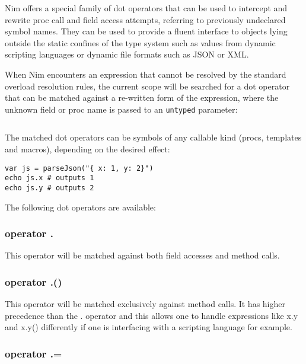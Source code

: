 Nim offers a special family of dot operators that can be used to
intercept and rewrite proc call and field access attempts, referring to
previously undeclared symbol names. They can be used to provide a fluent
interface to objects lying outside the static confines of the type
system such as values from dynamic scripting languages or dynamic file
formats such as JSON or XML.

When Nim encounters an expression that cannot be resolved by the
standard overload resolution rules, the current scope will be searched
for a dot operator that can be matched against a re-written form of the
expression, where the unknown field or proc name is passed to an
\texttt{untyped} parameter:

\begin{verbatim}
\end{verbatim}

The matched dot operators can be symbols of any callable kind (procs,
templates and macros), depending on the desired effect:

\begin{verbatim}
var js = parseJson("{ x: 1, y: 2}")
echo js.x # outputs 1
echo js.y # outputs 2
\end{verbatim}

The following dot operators are available:

\hypertarget{operator-.}{%
\subsubsection{\texorpdfstring{operator
{.}}{operator .}}\label{operator-.}}

This operator will be matched against both field accesses and method
calls.

\hypertarget{operator-.-1}{%
\subsubsection{\texorpdfstring{operator
{.()}}{operator .()}}\label{operator-.-1}}

This operator will be matched exclusively against method calls. It has
higher precedence than the {.} operator and this allows one to handle
expressions like {x.y} and {x.y()} differently if one is interfacing
with a scripting language for example.

\hypertarget{operator-.-2}{%
\subsubsection{\texorpdfstring{operator
{.=}}{operator .=}}\label{operator-.-2}}

